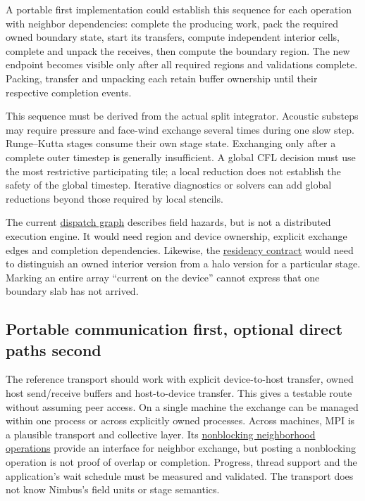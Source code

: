 A portable first implementation could establish this sequence for each
operation with neighbor dependencies: complete the producing work, pack the
required owned boundary state, start its transfers, compute independent
interior cells, complete and unpack the receives, then compute the boundary
region. The new endpoint becomes visible only after all required regions
and validations complete. Packing, transfer and unpacking each retain buffer
ownership until their respective completion events.

This sequence must be derived from the actual split integrator. Acoustic
substeps may require pressure and face-wind exchange several times during one
slow step. Runge--Kutta stages consume their own stage state. Exchanging only
after a complete outer timestep is generally insufficient. A global CFL
decision must use the most restrictive participating tile; a local reduction
does not establish the safety of the global timestep. Iterative diagnostics
or solvers can add global reductions beyond those required by local stencils.

The current \href{../include/compute/dispatch_graph.hpp}{dispatch graph}
describes field hazards, but is not a distributed execution engine. It would
need region and device ownership, explicit exchange edges and completion
dependencies. Likewise, the
\href{../include/compute/compute_residency.hpp}{residency contract} would need
to distinguish an owned interior version from a halo version for a particular
stage. Marking an entire array ``current on the device'' cannot express that
one boundary slab has not arrived.

\subsection{Portable communication first, optional direct paths second}

The reference transport should work with explicit device-to-host transfer,
owned host send/receive buffers and host-to-device transfer. This gives a
testable route without assuming peer access. On a single machine the exchange
can be managed within one process or across explicitly owned processes.
Across machines, MPI is a plausible transport and collective layer. Its
\href{https://www.mpi-forum.org/docs/mpi-4.1/mpi41-report/node235.htm}{nonblocking
neighborhood operations} provide an interface for neighbor exchange, but
posting a nonblocking operation is not proof of overlap or completion. Progress,
thread support and the application's wait schedule must be measured and
validated. The transport does not know Nimbus's field units or stage semantics.

